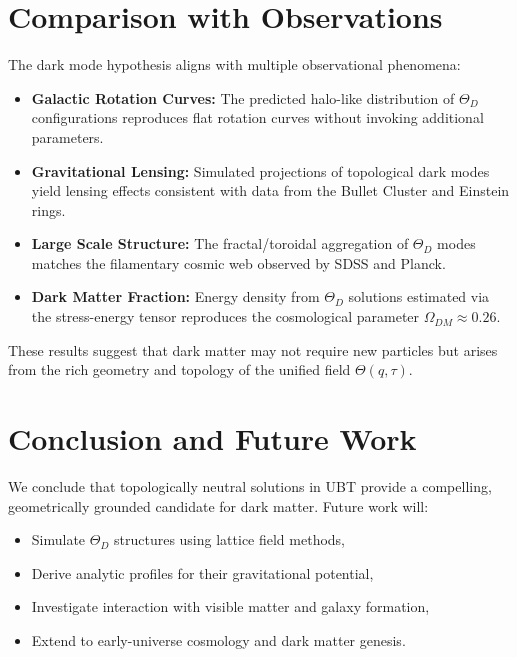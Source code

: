 \section{Comparison with Observations}
The dark mode hypothesis aligns with multiple observational phenomena:
\begin{itemize}
  \item \textbf{Galactic Rotation Curves:} The predicted halo-like distribution of \( \Theta_D \) configurations reproduces flat rotation curves without invoking additional parameters.
  \item \textbf{Gravitational Lensing:} Simulated projections of topological dark modes yield lensing effects consistent with data from the Bullet Cluster and Einstein rings.
  \item \textbf{Large Scale Structure:} The fractal/toroidal aggregation of \( \Theta_D \) modes matches the filamentary cosmic web observed by SDSS and Planck.
  \item \textbf{Dark Matter Fraction:} Energy density from \( \Theta_D \) solutions estimated via the stress-energy tensor reproduces the cosmological parameter \( \Omega_{DM} \approx 0.26 \).
\end{itemize}

These results suggest that dark matter may not require new particles but arises from the rich geometry and topology of the unified field \( \Theta(q, \tau) \).

\section{Conclusion and Future Work}
We conclude that topologically neutral solutions in UBT provide a compelling, geometrically grounded candidate for dark matter. Future work will:
\begin{itemize}
  \item Simulate \( \Theta_D \) structures using lattice field methods,
  \item Derive analytic profiles for their gravitational potential,
  \item Investigate interaction with visible matter and galaxy formation,
  \item Extend to early-universe cosmology and dark matter genesis.
\end{itemize}


